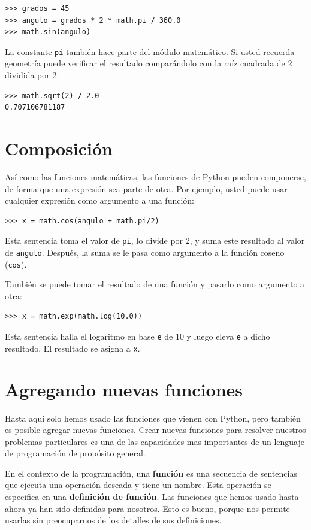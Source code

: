 \begin{verbatim}
>>> grados = 45
>>> angulo = grados * 2 * math.pi / 360.0
>>> math.sin(angulo)
\end{verbatim}
 La constante \texttt{pi} también hace parte del módulo matemático.
Si usted recuerda geometría puede verificar el resultado comparándolo
con la raíz cuadrada de 2 dividida por 2:

\begin{verbatim}
>>> math.sqrt(2) / 2.0
0.707106781187
\end{verbatim}
 

\section{Composición}

 

Así como las funciones matemáticas, las funciones de Python pueden
componerse, de forma que una expresión sea parte de otra. Por ejemplo,
usted puede usar cualquier expresión como argumento a una función:

\begin{verbatim}
>>> x = math.cos(angulo + math.pi/2)
\end{verbatim}

Esta sentencia toma el valor de \texttt{pi}, lo divide por 2, y suma
este resultado al valor de \texttt{angulo}. Después, la suma se le
pasa como argumento a la función coseno (\texttt{cos}).

También se puede tomar el resultado de una función y pasarlo como
argumento a otra:
\begin{verbatim}
>>> x = math.exp(math.log(10.0))
\end{verbatim}

Esta sentencia halla el logaritmo en base \texttt{e} de 10 y luego
eleva \texttt{e} a dicho resultado. El resultado se asigna a \texttt{x}.

\section{Agregando nuevas funciones}

Hasta aquí solo hemos usado las funciones que vienen con Python, pero
también es posible agregar nuevas funciones. Crear nuevas funciones
para resolver nuestros problemas particulares es una de las capacidades
mas importantes de un lenguaje de programación de propósito general.

En el contexto de la programación, una \textbf{función} es una secuencia
de sentencias que ejecuta una operación deseada y tiene un nombre.
Esta operación se especifica en una \textbf{definición de función}.
Las funciones que hemos usado hasta ahora ya han sido definidas para
nosotros. Esto es bueno, porque nos permite usarlas sin preocuparnos
de los detalles de sus definiciones.

